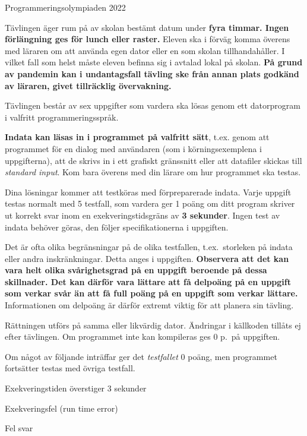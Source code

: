 
\thispagestyle{fancy}
\lstset{basicstyle=\ttfamily,
  breaklines=true}

\begin{center}
\Huge{Programmeringsolympiaden 2022}
\end{center}
\vspace{-1.2cm} 
\begin{lista}
\item Tävlingen äger rum på av skolan bestämt datum under {\bf fyra
    timmar. Ingen förlängning ges för lunch eller raster.} Eleven ska i förväg komma överens med läraren om att använda egen dator eller en som skolan tillhandahåller. I vilket fall som helst måste eleven befinna sig i avtalad lokal på skolan. {\bf På grund av pandemin kan i undantagsfall tävling ske från annan plats godkänd av läraren, givet tillräcklig övervakning.}
\item Tävlingen består av sex uppgifter som vardera ska lösas genom ett
  datorprogram i valfritt programmeringsspråk.
\item {\bf Indata kan läsas in i programmet på valfritt sätt}, t.ex. genom att programmet för en dialog med användaren (som i körningsexemplena i uppgifterna), att de skrivs in i ett grafiskt gränssnitt eller att datafiler skickas till {\em standard input}. Kom bara överens med din lärare om hur programmet ska testas.
\item Dina lösningar kommer att testköras med förpreparerade
  indata. Varje uppgift testas normalt med 5 testfall, som vardera ger
  1 poäng om ditt program skriver ut korrekt svar inom en exekveringstidsgräns av
  {\bf 3 sekunder}. Ingen test av indata behöver göras, den följer specifikationerna 
i uppgiften.
\item Det är ofta olika begränsningar på de olika testfallen, t.ex.\ storleken på
indata eller andra inskränkningar. Detta anges i uppgiften. {\bf Observera att det kan vara
helt olika svårighetsgrad på en uppgift beroende på dessa skillnader. Det kan därför vara
lättare att få delpoäng på en uppgift som verkar svår än att få full
poäng på en uppgift som verkar lättare.} Informationen om delpoäng är
därför extremt viktig för att planera sin
tävling.
\item Rättningen utförs på samma eller likvärdig dator. Ändringar
  i källkoden tillåts ej efter tävlingen. Om programmet
  inte kan kompileras ges 0 p.\ på uppgiften. 
\item Om något av följande inträffar ger
  det {\em testfallet} 0 poäng, men programmet fortsätter testas med övriga testfall.
\begin{lista}
\item Exekveringstiden överstiger 3 sekunder \vspace{-0.2cm}
\item Exekveringsfel (run time error) \vspace{-0.2cm}
\item Fel svar \vspace{-0.2cm}
\end{lista}


\end{lista}
